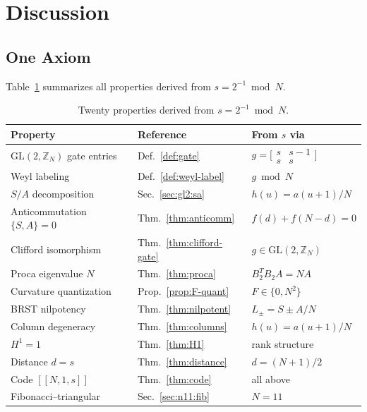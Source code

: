 \documentclass[aip,jmp,reprint,superscriptaddress,floatfix,nofootinbib]{revtex4-2}
\theoremstyle{definition}
\theoremstyle{remark}
\newcommand{\ZN}{\mathbb{Z}_N}
\newcommand{\GL}{\mathrm{GL}}
\begin{document}
\section{Discussion}
\label{sec:discussion}

\subsection{One Axiom}
\label{sec:disc:axiom}

Table~\ref{tab:one-axiom} summarizes all properties derived from
$s = 2^{-1} \bmod N$.

\begin{table}[ht]
\centering
\caption{Twenty properties derived from $s = 2^{-1} \bmod N$.}
\label{tab:one-axiom}
\begin{tabular}{lll}
\toprule
Property & Reference & From $s$ via \\
\midrule
$\GL(2,\ZN)$ gate entries & Def.~\ref{def:gate} & $g = \bigl[\begin{smallmatrix} s & s{-}1 \\ s & s\end{smallmatrix}\bigr]$ \\
Weyl labeling & Def.~\ref{def:weyl-label} & $g \bmod N$ \\
$S/A$ decomposition & Sec.~\ref{sec:gl2:sa} & $h(u) = a(u{+}1)/N$ \\
Anticommutation $\{S,A\}=0$ & Thm.~\ref{thm:anticomm} & $f(d)+f(N{-}d)=0$ \\
Clifford isomorphism & Thm.~\ref{thm:clifford-gate} & $g \in \GL(2,\ZN)$ \\
Proca eigenvalue $N$ & Thm.~\ref{thm:proca} & $B_2^T B_2 A = NA$ \\
Curvature quantization & Prop.~\ref{prop:F-quant} & $F\in\{0,N^2\}$ \\
BRST nilpotency & Thm.~\ref{thm:nilpotent} & $L_\pm = S \pm A/N$ \\
Column degeneracy & Thm.~\ref{thm:columns} & $h(u)=a(u{+}1)/N$ \\
$H^1 = 1$ & Thm.~\ref{thm:H1} & rank structure \\
Distance $d = s$ & Thm.~\ref{thm:distance} & $d = (N{+}1)/2$ \\
Code $[[N,1,s]]$ & Thm.~\ref{thm:code} & all above \\
Fibonacci--triangular & Sec.~\ref{sec:n11:fib} & $N=11$ \\

\end{tabular}
\end{table}
\end{document}
